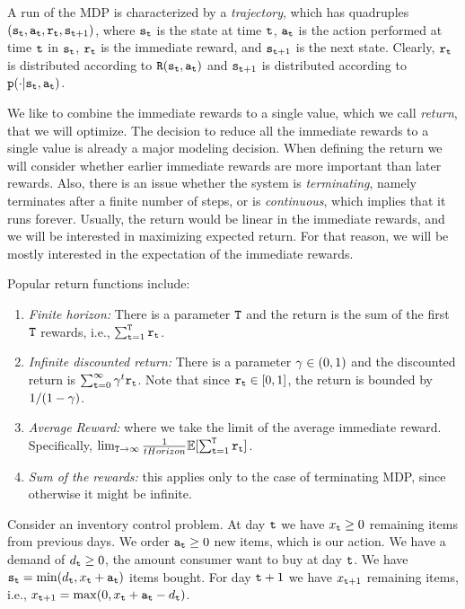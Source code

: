 A run of the MDP is characterized by a {\em trajectory}, which has
quadruples $({\tt s}_{\tt t},{\tt a}_{\tt t}, {\tt r}_{\tt t},
{\tt s}_{{\tt t}+1})$, where ${\tt s}_{\tt t}$ is the state at time
${\tt t}$, ${\tt a}_{\tt t}$ is the action performed at time ${\tt t}$
in ${\tt s}_{\tt t}$, ${\tt r}_{\tt t}$ is the immediate reward, and
${\tt s}_{{\tt t}+1}$ is the next state. Clearly, ${\tt r}_{\tt t}$ is
distributed according to ${\tt R}({\tt s}_{\tt t},{\tt a}_{\tt t})$
and ${\tt s}_{{\tt t}+1}$ is distributed according to
${\tt p}(\cdot|{\tt s}_{\tt t},{\tt a}_{\tt t})$.

\medskip
{}
%
We like to combine the immediate rewards to a single value, which we
call {\em return}, that we will optimize. The decision to reduce all
the immediate rewards to a single value is already a major modeling
decision. When defining the return we will consider whether earlier
immediate rewards are more important than later rewards. Also, there
is an issue whether the system is {\em terminating}, namely
terminates after a finite number of steps, or is {\em continuous},
which implies that it runs forever. Usually, the return would be
linear in the immediate rewards, and we will be interested in
maximizing expected return. For that reason, we will be mostly
interested in the expectation of the immediate rewards.

Popular return functions include:
\begin{enumerate}
\item
{\em Finite horizon:} There is a parameter ${\tt T}$ and the
return is the sum of the first ${\tt T}$ rewards, i.e.,
$\sum_{{\tt t}=1}^{\tt T} {\tt r}_{\tt t}$.
\item
{\em Infinite discounted return:} There is a parameter
$\gamma\in(0,1)$ and the discounted return is
$\sum_{{\tt t}=0}^\infty \gamma^t {\tt r}_{\tt t}$. Note that since
${\tt r}_{\tt t}\in[0,1]$, the return is bounded by
$1/(1-\gamma)$.
\item
{\em Average Reward:} where we take the limit of the average
immediate reward. Specifically, $\lim_{{\tt T}\rightarrow \infty}
\frac{1}{tHorizon} \mathbb{E}[\sum_{{\tt t}=1}^{\tt T} {\tt r}_{\tt t}]$.
\item
{\em Sum of the rewards:} this applies only to the case of
terminating MDP, since otherwise it might be infinite.
\end{enumerate}

\medskip
{}
%
Consider an inventory control problem. At day ${\tt t}$ we have
$x_{\tt t} \geq 0$ remaining items from previous days. We order
${\tt a}_{\tt t}\geq 0$ new items, which is our action. We have a
demand of $d_{\tt t}\geq 0$, the amount consumer want to buy at day
${\tt t}$. We have
${\tt s}_{\tt t}=\min(d_{\tt t},x_{\tt t}+{\tt a}_{\tt t})$ items bought.
For day ${\tt t}+1$ we have $x_{{\tt t}+1}$ remaining items, i.e.,
$x_{{\tt t}+1}=\max(0,x_{\tt t}+{\tt a}_{\tt t}-d_{\tt t})$.

